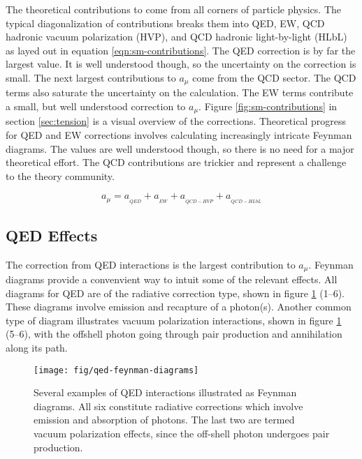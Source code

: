 The theoretical contributions to \mugmtwo come from all corners of particle physics.  The typical diagonalization of contributions breaks them into QED, EW, QCD hadronic vacuum polarization (HVP), and QCD hadronic light-by-light (HLbL) as layed out in equation \ref{eqn:sm-contributions}. The QED correction is by far the largest value. It is well understood though, so the uncertainty on the correction is small.  The next largest contributions to $a_\mu$ come from the QCD sector.  The QCD terms also saturate the uncertainty on the calculation.  The EW terms contribute a small, but well understood correction to $a_\mu$.  Figure \ref{fig:sm-contributions} in section \ref{sec:tension} is a visual overview of the corrections.  Theoretical progress for QED and EW corrections involves calculating increasingly intricate Feynman diagrams. The values are well understood though, so there is no need for a major theoretical effort.  The QCD contributions are trickier and represent a challenge to the theory community.

\begin{equation}
\label{eqn:sm-contributions}
a_\mu = a_{_{QED}} + a_{_{EW}} + a_{_{QCD-HVP}} + a_{_{QCD-HLbL}}
\end{equation}

\subsection{QED Effects} \label{s-sec:theory-qed}

The correction from QED interactions is the largest contribution to $a_\mu$.  Feynman diagrams provide a convenvient way to intuit some of the relevant effects.  All diagrams for QED are of the radiative correction type, shown in figure \ref{fig:qed-feynman-diagrams} (1\hbox{--}6).  These diagrams involve emission and recapture of a photon(s).  Another common type of diagram illustrates vacuum polarization interactions, shown in figure \ref{fig:qed-feynman-diagrams} (5\hbox{--}6), with the offshell photon going through pair production and annihilation along its path.

\begin{figure}
\centering
\texttt{[image: fig/qed-feynman-diagrams]}
\caption{
    Several examples of QED interactions illustrated as Feynman diagrams.  All six constitute radiative corrections which involve emission and absorption of photons. The last two are termed vacuum polarization effects, since the off-shell photon undergoes pair production.
    \label{fig:qed-feynman-diagrams}
}
\end{figure}

